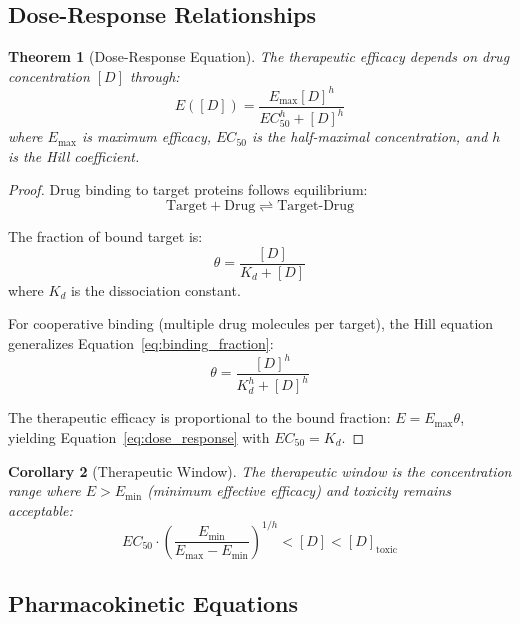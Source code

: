 \documentclass[11pt,twocolumn,a4paper]{article}
\newtheorem{theorem}{Theorem}[section]
\newtheorem{corollary}[theorem]{Corollary}
\theoremstyle{definition}
\theoremstyle{remark}
\begin{document}
\subsection{Dose-Response Relationships}

\begin{theorem}[Dose-Response Equation]
\label{thm:dose_response}
The therapeutic efficacy depends on drug concentration $[D]$ through:
\begin{equation}
E([D]) = \frac{E_{\max} [D]^h}{EC_{50}^h + [D]^h}
\label{eq:dose_response}
\end{equation}
where $E_{\max}$ is maximum efficacy, $EC_{50}$ is the half-maximal concentration, and $h$ is the Hill coefficient.
\end{theorem}

\begin{proof}
Drug binding to target proteins follows equilibrium:
\begin{equation}
\text{Target} + \text{Drug} \rightleftharpoons \text{Target-Drug}
\end{equation}

The fraction of bound target is:
\begin{equation}
\theta = \frac{[D]}{K_d + [D]}
\label{eq:binding_fraction}
\end{equation}
where $K_d$ is the dissociation constant.

For cooperative binding (multiple drug molecules per target), the Hill equation generalizes Equation~\eqref{eq:binding_fraction}:
\begin{equation}
\theta = \frac{[D]^h}{K_d^h + [D]^h}
\end{equation}

The therapeutic efficacy is proportional to the bound fraction: $E = E_{\max} \theta$, yielding Equation~\eqref{eq:dose_response} with $EC_{50} = K_d$.
\end{proof}

\begin{corollary}[Therapeutic Window]
\label{cor:therapeutic_window}
The therapeutic window is the concentration range where $E > E_{\min}$ (minimum effective efficacy) and toxicity remains acceptable:
\begin{equation}
EC_{50} \cdot \left(\frac{E_{\min}}{E_{\max} - E_{\min}}\right)^{1/h} < [D] < [D]_{\mathrm{toxic}}
\label{eq:therapeutic_window}
\end{equation}
\end{corollary}

\subsection{Pharmacokinetic Equations}
\end{document}
